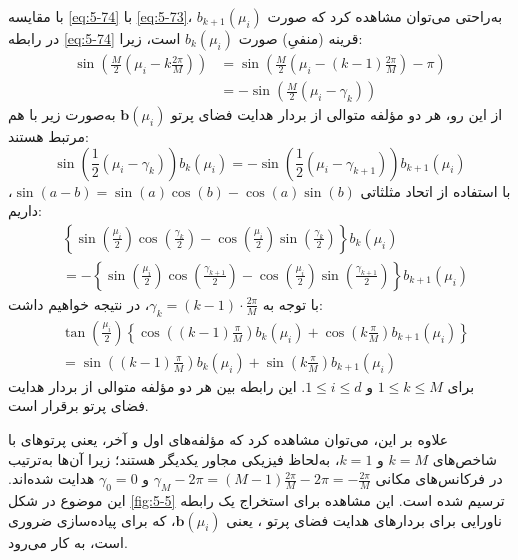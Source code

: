 با مقایسه \eqref{eq:5-74} با \eqref{eq:5-73}، به‌راحتی می‌توان مشاهده کرد که صورت $b_{k+1}(\mu_i)$ در رابطه \eqref{eq:5-74} قرینه (منفیِ) صورت $b_k(\mu_i)$ است، زیرا:
\begin{align*}
	\sin \left( \frac{M}{2} \left( \mu_i - k \frac{2\pi}{M} \right) \right) &= \sin \left( \frac{M}{2} \left( \mu_i - (k-1) \frac{2\pi}{M} \right) - \pi \right) \\
	&= -\sin \left( \frac{M}{2} (\mu_i - \gamma_k) \right)
\end{align*}
از این رو، هر دو مؤلفه متوالی از بردار هدایت فضای پرتو $\bm{b}(\mu_i)$ به‌صورت زیر با هم مرتبط هستند:
\begin{equation*}
	\sin \left( \frac{1}{2} (\mu_i - \gamma_k) \right) b_k(\mu_i) = -\sin \left( \frac{1}{2} (\mu_i - \gamma_{k+1}) \right) b_{k+1}(\mu_i)
\end{equation*}
با استفاده از اتحاد مثلثاتی $\sin(a - b) = \sin(a)\cos(b) - \cos(a)\sin(b)$، داریم:
\begin{equation}
	\begin{aligned}
		&\left\{ \sin \left( \frac{\mu_i}{2} \right) \cos \left( \frac{\gamma_k}{2} \right) - \cos \left( \frac{\mu_i}{2} \right) \sin \left( \frac{\gamma_k}{2} \right) \right\} b_k(\mu_i) \\
		&= - \left\{ \sin \left( \frac{\mu_i}{2} \right) \cos \left( \frac{\gamma_{k+1}}{2} \right) - \cos \left( \frac{\mu_i}{2} \right) \sin \left( \frac{\gamma_{k+1}}{2} \right) \right\} b_{k+1}(\mu_i)
	\end{aligned}
	\label{eq:5-75}
\end{equation}
با توجه به $\gamma_k = (k-1) \cdot \frac{2\pi}{M}$، در نتیجه خواهیم داشت:
\begin{equation}
	\begin{aligned}
		&\tan \left( \frac{\mu_i}{2} \right) \left\{ \cos \left( (k-1) \frac{\pi}{M} \right) b_k(\mu_i) + \cos \left( k \frac{\pi}{M} \right) b_{k+1}(\mu_i) \right\} \\
		&= \sin \left( (k-1) \frac{\pi}{M} \right) b_k(\mu_i) + \sin \left( k \frac{\pi}{M} \right) b_{k+1}(\mu_i)
	\end{aligned}
	\label{eq:5-76}
\end{equation}
برای $1 \le k \le M$ و $1 \le i \le d$. این رابطه بین هر دو مؤلفه متوالی از بردار هدایت فضای پرتو برقرار است.


علاوه بر این، می‌توان مشاهده کرد که مؤلفه‌های اول و آخر، یعنی پرتوهای با شاخص‌های $k = M$ و $k = 1$، به‌لحاظ فیزیکی مجاور یکدیگر هستند؛ زیرا آن‌ها به‌ترتیب در فرکانس‌های مکانی $\gamma_M - 2\pi = (M-1) \frac{2\pi}{M} - 2\pi = -\frac{2\pi}{M}$ و $\gamma_0 = 0$ هدایت شده‌اند. این موضوع در شکل \ref{fig:5-5} ترسیم شده است. این مشاهده برای استخراج یک رابطه ناورایی برای بردارهای هدایت فضای پرتو ، یعنی $\bm{b}(\mu_i)$، که برای پیاده‌سازی  ضروری است، به کار می‌رود.



